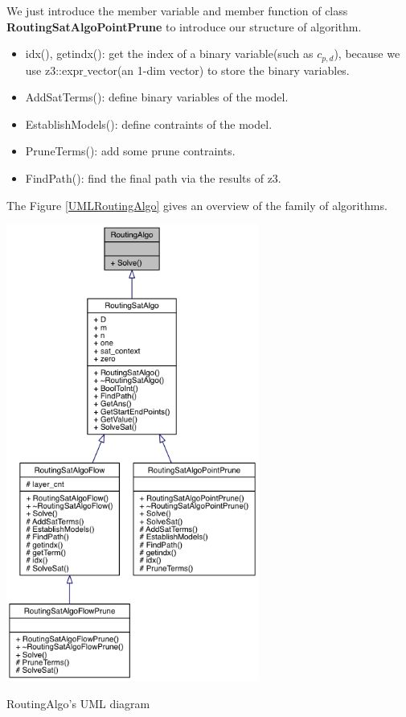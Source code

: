 \documentclass[twocolumn]{article}
\begin{document}
We just introduce the member variable and member function of class \textbf{RoutingSatAlgoPointPrune} to introduce our structure of algorithm.

\begin{itemize}
    \item idx(), getindx(): get the index of a binary variable(such as $c_{p,d}$), because we use z3::expr$\_$vector(an 1-dim vector) to store the binary variables.
    \item AddSatTerms(): define binary variables of the model.
    \item EstablishModels(): define contraints of the model.
    \item PruneTerms(): add some prune contraints.
    \item FindPath(): find the final path via the results of z3.
\end{itemize}

The Figure \ref{UMLRoutingAlgo} gives an overview of the family of algorithms.

\begin{center}
\makeatletter
\def\@captype{figure}
\makeatother
\includegraphics [height=15cm]{UMLRoutingAlgo}
\caption{RoutingAlgo's UML diagram}
\label{UMLRoutingAlgo}
\end{center}
\end{document}
